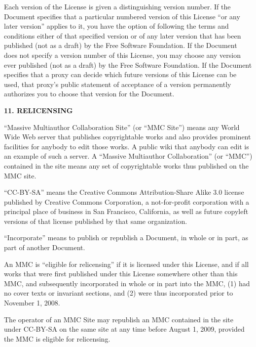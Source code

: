 \documentclass[10pt,a4paper,ngerman,titlepage,tocindentauto]{article}
\begin{document}
\begin{multicols}{3}
{					Each version of the License is given a distinguishing version number.
					If the Document specifies that a particular numbered version of this
					License ``or any later version'' applies to it, you have the option of
					following the terms and conditions either of that specified version or
					of any later version that has been published (not as a draft) by the
					Free Software Foundation.  If the Document does not specify a version
					number of this License, you may choose any version ever published (not
					as a draft) by the Free Software Foundation.  If the Document
					specifies that a proxy can decide which future versions of this
					License can be used, that proxy's public statement of acceptance of a
					version permanently authorizes you to choose that version for the
					Document.


					\begin{center}
					{\bf 11. RELICENSING\par}
					\end{center}

					``Massive Multiauthor Collaboration Site'' (or ``MMC Site'') means any
					World Wide Web server that publishes copyrightable works and also
					provides prominent facilities for anybody to edit those works.  A
					public wiki that anybody can edit is an example of such a server.  A
					``Massive Multiauthor Collaboration'' (or ``MMC'') contained in the
					site means any set of copyrightable works thus published on the MMC
					site.

					``CC-BY-SA'' means the Creative Commons Attribution-Share Alike 3.0
					license published by Creative Commons Corporation, a not-for-profit
					corporation with a principal place of business in San Francisco,
					California, as well as future copyleft versions of that license
					published by that same organization.

					``Incorporate'' means to publish or republish a Document, in whole or
					in part, as part of another Document.

					An MMC is ``eligible for relicensing'' if it is licensed under this
					License, and if all works that were first published under this License
					somewhere other than this MMC, and subsequently incorporated in whole
					or in part into the MMC, (1) had no cover texts or invariant sections,
					and (2) were thus incorporated prior to November 1, 2008.

					The operator of an MMC Site may republish an MMC contained in the site
					under CC-BY-SA on the same site at any time before August 1, 2009,
					provided the MMC is eligible for relicensing.


}
\end{multicols}
\end{document}
